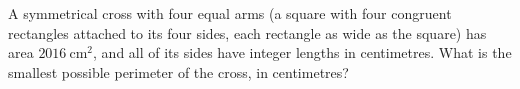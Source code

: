 A symmetrical cross with four equal arms (a square with four congruent rectangles attached to its four sides, each rectangle as wide as the square) has area $2016\ \text{cm}^2$, and all of its sides have integer lengths in centimetres. What is the smallest possible perimeter of the cross, in centimetres?
